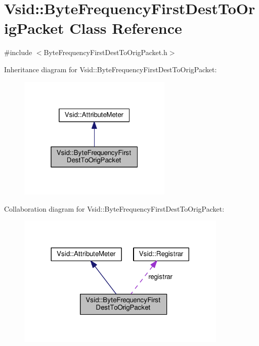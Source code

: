 \hypertarget{class_vsid_1_1_byte_frequency_first_dest_to_orig_packet}{\section{Vsid\-:\-:Byte\-Frequency\-First\-Dest\-To\-Orig\-Packet Class Reference}
\label{class_vsid_1_1_byte_frequency_first_dest_to_orig_packet}
}


{\ttfamily \#include $<$Byte\-Frequency\-First\-Dest\-To\-Orig\-Packet.\-h$>$}



Inheritance diagram for Vsid\-:\-:Byte\-Frequency\-First\-Dest\-To\-Orig\-Packet\-:
\nopagebreak
\begin{figure}[H]
\begin{center}
\leavevmode
\includegraphics[width=208pt]{class_vsid_1_1_byte_frequency_first_dest_to_orig_packet__inherit__graph}
\end{center}
\end{figure}


Collaboration diagram for Vsid\-:\-:Byte\-Frequency\-First\-Dest\-To\-Orig\-Packet\-:
\nopagebreak
\begin{figure}[H]
\begin{center}
\leavevmode
\includegraphics[width=284pt]{class_vsid_1_1_byte_frequency_first_dest_to_orig_packet__coll__graph}
\end{center}
\end{figure}
